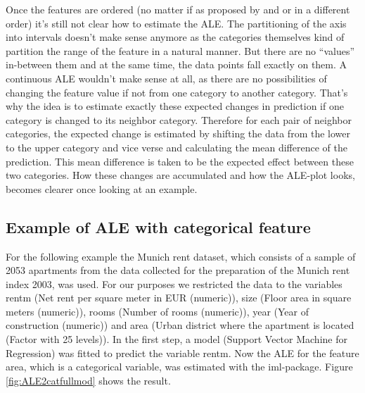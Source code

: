 \documentclass[]{krantz}
\begin{document}
Once the features are ordered (no matter if as proposed by
\citep{Apley2016} and \citep{molnar2019} or in a different order) it's
still not clear how to estimate the ALE. The partitioning of the axis
into intervals doesn't make sense anymore as the categories themselves
kind of partition the range of the feature in a natural manner. But
there are no ``values'' in-between them and at the same time, the data
points fall exactly on them. A continuous ALE wouldn't make sense at
all, as there are no possibilities of changing the feature value if not
from one category to another category. That's why the idea is to
estimate exactly these expected changes in prediction if one category is
changed to its neighbor category. Therefore for each pair of neighbor
categories, the expected change is estimated by shifting the data from
the lower to the upper category and vice verse and calculating the mean
difference of the prediction. This mean difference is taken to be the
expected effect between these two categories. How these changes are
accumulated and how the ALE-plot looks, becomes clearer once looking at
an example.

\subsection{Example of ALE with categorical
feature}\label{example-of-ale-with-categorical-feature}

For the following example the Munich rent dataset, which consists of a
sample of 2053 apartments from the data collected for the preparation of
the Munich rent index 2003, was used. For our purposes we restricted the
data to the variables rentm (Net rent per square meter in EUR
(numeric)), size (Floor area in square meters (numeric)), rooms (Number
of rooms (numeric)), year (Year of construction (numeric)) and area
(Urban district where the apartment is located (Factor with 25 levels)).
In the first step, a model (Support Vector Machine for Regression) was
fitted to predict the variable rentm. Now the ALE for the feature area,
which is a categorical variable, was estimated with the iml-package.
Figure \ref{fig:ALE2catfullmod} shows the result.
\end{document}
